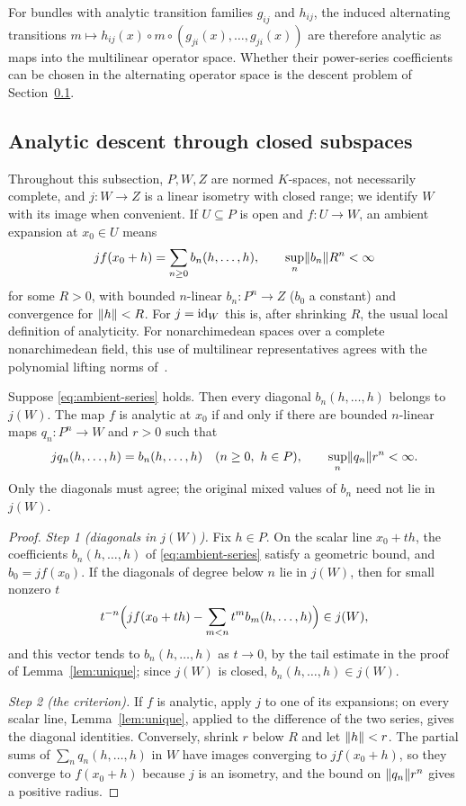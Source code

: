 For bundles with analytic transition families $g_{ij}$ and $h_{ij}$, the induced alternating transitions $m\mapsto h_{ij}(x)\circ m\circ(g_{ji}(x),\ldots,g_{ji}(x))$ are therefore analytic as maps into the multilinear operator space. Whether their power-series coefficients can be chosen in the alternating operator space is the descent problem of Section~\ref{sec:descent}.

\subsection{Analytic descent through closed subspaces}\label{sec:descent}

Throughout this subsection, $P,W,Z$ are normed $K$-spaces, not necessarily complete, and $j\colon W\to Z$ is a linear isometry with closed range; we identify $W$ with its image when convenient. If $U\subseteq P$ is open and $f\colon U\to W$, an ambient expansion at $x_0\in U$ means
\begin{equation}\label{eq:ambient-series}
 jf(x_0+h)=\sum_{n\ge0}b_n(h,\ldots,h),\qquad
 \sup_n\lVert b_n\rVert R^n<\infty
\end{equation}
for some $R>0$, with bounded $n$-linear $b_n\colon P^n\to Z$ ($b_0$ a constant) and convergence for $\lVert h\rVert<R$. For $j=\mathrm{id}_W$ this is, after shrinking $R$, the usual local definition of analyticity. For nonarchimedean spaces over a complete nonarchimedean field, this use of multilinear representatives agrees with the polynomial lifting norms of~\cite[7.14--7.19]{BGN}.

\begin{theorem}\label{thm:coefficient-descent}
Suppose \eqref{eq:ambient-series} holds. Then every diagonal $b_n(h,\ldots,h)$ belongs to $j(W)$. The map $f$ is analytic at $x_0$ if and only if there are bounded $n$-linear maps $q_n\colon P^n\to W$ and $r>0$ such that
\[
 jq_n(h,\ldots,h)=b_n(h,\ldots,h)\quad(n\ge0,\ h\in P),
 \qquad \sup_n\norm{q_n}r^n<\infty.
\]
Only the diagonals must agree; the original mixed values of $b_n$ need not lie in $j(W)$.
\end{theorem}

\begin{proof}
\emph{Step 1 (diagonals in $j(W)$).} Fix $h\in P$. On the scalar line $x_0+th$, the coefficients $b_n(h,\ldots,h)$ of \eqref{eq:ambient-series} satisfy a geometric bound, and $b_0=jf(x_0)$. If the diagonals of degree below $n$ lie in $j(W)$, then for small nonzero $t$
\[
 t^{-n}\Bigl(jf(x_0+th)-\sum_{m<n}t^m b_m(h,\ldots,h)\Bigr)\in j(W),
\]
and this vector tends to $b_n(h,\ldots,h)$ as $t\to0$, by the tail estimate in the proof of Lemma~\ref{lem:unique}; since $j(W)$ is closed, $b_n(h,\ldots,h)\in j(W)$.

\emph{Step 2 (the criterion).} If $f$ is analytic, apply $j$ to one of its expansions; on every scalar line, Lemma~\ref{lem:unique}, applied to the difference of the two series, gives the diagonal identities. Conversely, shrink $r$ below $R$ and let $\lVert h\rVert<r$. The partial sums of $\sum_nq_n(h,\ldots,h)$ in $W$ have images converging to $jf(x_0+h)$, so they converge to $f(x_0+h)$ because $j$ is an isometry, and the bound on $\lVert q_n\rVert r^n$ gives a positive radius.
\end{proof}

